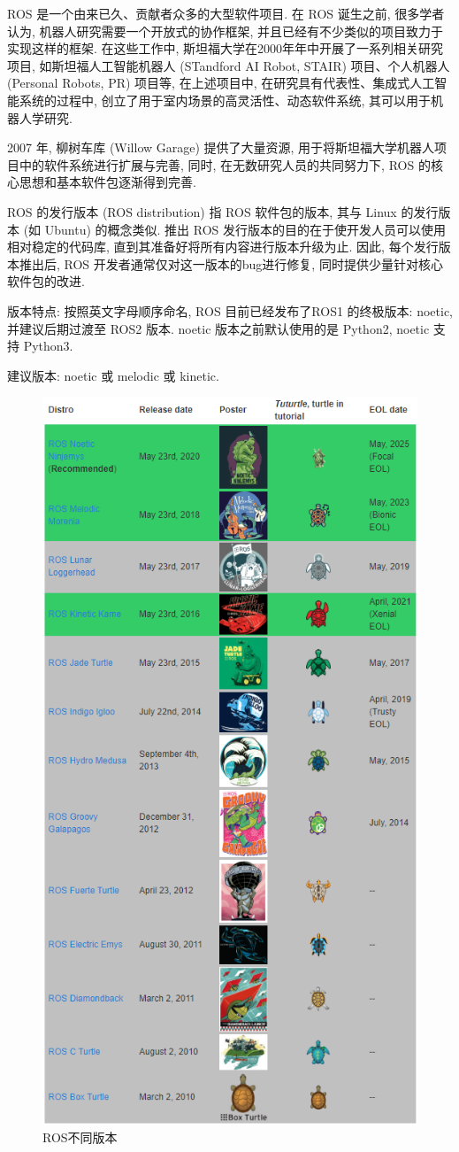\documentclass[openany, fontset=windowsold]{ctexbook}
\theoremstyle{kaiti}
\theoremstyle{normal}
\begin{document}
ROS 是一个由来已久、贡献者众多的大型软件项目. 在 ROS 诞生之前, 很多学者认为, 机器人研究需要一个开放式的协作框架, 并且已经有不少类似的项目致力于实现这样的框架. 在这些工作中, 斯坦福大学在2000年年中开展了一系列相关研究项目, 如斯坦福人工智能机器人 (STandford AI Robot, STAIR) 项目、个人机器人 (Personal Robots, PR) 项目等, 在上述项目中, 在研究具有代表性、集成式人工智能系统的过程中, 创立了用于室内场景的高灵活性、动态软件系统, 其可以用于机器人学研究.

2007 年, 柳树车库 (Willow Garage) 提供了大量资源, 用于将斯坦福大学机器人项目中的软件系统进行扩展与完善, 同时, 在无数研究人员的共同努力下, ROS 的核心思想和基本软件包逐渐得到完善.

ROS 的发行版本 (ROS distribution) 指 ROS 软件包的版本, 其与 Linux 的发行版本 (如 Ubuntu) 的概念类似. 推出 ROS 发行版本的目的在于使开发人员可以使用相对稳定的代码库, 直到其准备好将所有内容进行版本升级为止. 因此, 每个发行版本推出后, ROS 开发者通常仅对这一版本的bug进行修复, 同时提供少量针对核心软件包的改进.

版本特点: 按照英文字母顺序命名, ROS 目前已经发布了ROS1 的终极版本: noetic, 并建议后期过渡至 ROS2 版本. noetic 版本之前默认使用的是 Python2, noetic 支持 Python3.

建议版本: noetic 或 melodic 或 kinetic.

\begin{figure}[!ht]
  \centering
  \includegraphics[width=.55\textwidth]{ros_versions.png}
  \caption{ROS不同版本}
  \label{fig:ros_versions}
\end{figure}
\end{document}
